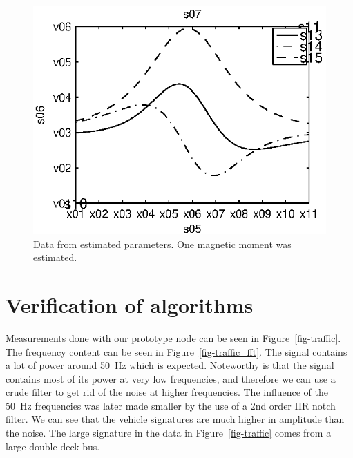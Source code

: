 \begin{subfigures}
\begin{figure}[!htbf]
  \centering
%   
   \begin{minipage}{0.45\linewidth}
    \centering
    
    \includegraphics[width=\linewidth]{images/meas_data_one}
   \caption[Data from estimated parameters, one magnetic moment.]{Data from estimated parameters. One magnetic moment was estimated.}
   \label{fig-est_data_one}
   \end{minipage}
  \end{figure}
\end{subfigures}

\section{Verification of algorithms}

Measurements done with our prototype node can be seen in Figure~\ref{fig-traffic}. The frequency content can be seen in Figure~\ref{fig-traffic_fft}. The signal contains a lot of power around 50~Hz which is expected. Noteworthy is that the signal contains most of its power at very low frequencies, and therefore we can use a crude filter to get rid of the noise at higher frequencies. The influence of the 50~Hz frequencies was later made smaller by the use of a 2nd order IIR notch filter. We can see that the vehicle signatures are much higher in amplitude than the noise. The large signature in the data in Figure~\ref{fig-traffic} comes from a large double-deck bus.

